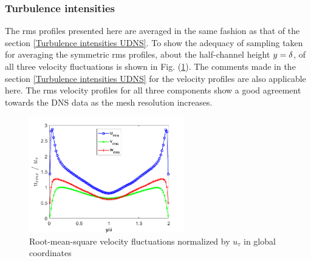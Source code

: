 \subsubsection{Turbulence intensities}
The rms profiles presented here are averaged in the same fashion as that of the section \ref{Turbulence intensities UDNS}. To show the adequacy of sampling taken for averaging the symmetric rms profiles, about the half-channel height $y  = \delta$, of all three velocity fluctuations is shown in Fig. (\ref{Turbulence intensities WALE}). The comments made in the section \ref{Turbulence intensities UDNS} for the velocity profiles are also applicable here.
The rms velocity profiles for all three components show a good agreement towards the DNS data as the mesh resolution increases.
%
\begin{figure}[h!]
    \centering
    \includegraphics[width=0.6\textwidth]{06_Resultsanddiscussion/figur/WALE/Turbulence intensities_Mesh2.png}
    \caption{Root-mean-square velocity fluctuations normalized by $u_\tau$ in global coordinates}
    \label{Turbulence intensities WALE}
\end{figure}
%

